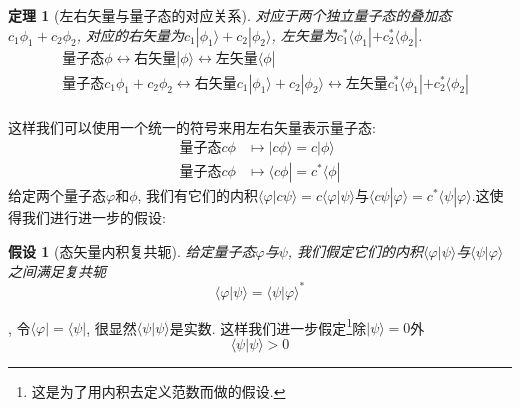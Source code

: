 \documentclass[a4paper,11pt]{article}
\theoremstyle{mystyle}
\newtheorem{theorem}{\hspace{2em}定理}[section]
\newtheorem{hypothesis}{\hspace{2em}假设}[section]
\begin{document}
\begin{theorem}[左右矢量与量子态的对应关系]
  对应于两个独立量子态的叠加态$c_1\phi_1+c_2\phi_2$, 对应的右矢量为$c_1|\phi_1\rangle+c_2|\phi_2\rangle$, 左矢量为$c_1^*\langle\phi_1|+c_2^*\langle\phi_2|$.
\begin{equation*}
  \begin{split}
     &\text{量子态}\phi\longleftrightarrow\text{右矢量}|\phi\rangle\longleftrightarrow\text{左矢量}\langle\phi|\\
     &\text{量子态}c_1\phi_1+c_2\phi_2\longleftrightarrow\text{右矢量}c_1|\phi_1\rangle+c_2|\phi_2\rangle\longleftrightarrow\text{左矢量}c_1^*\langle\phi_1|+c_2^*\langle\phi_2|\\
  \end{split}
\end{equation*}
\end{theorem}
这样我们可以使用一个统一的符号来用左右矢量表示量子态:
\begin{equation*}
  \begin{split}
     \text{量子态}c\phi & \longmapsto|c\phi\rangle=c|\phi\rangle \\
     \text{量子态}c\phi & \longmapsto\langle c\phi|=c^*\langle\phi|
  \end{split}
\end{equation*}
给定两个量子态$\varphi$和$\phi$, 我们有它们的内积$\langle\varphi|c\psi\rangle=c\langle\varphi|\psi\rangle$与$\langle c\psi|\varphi\rangle=c^*\langle\psi|\varphi\rangle$.这使得我们进行进一步的假设:
\begin{hypothesis}[态矢量内积复共轭]
给定量子态$\varphi$与$\psi$, 我们假定它们的内积$\langle\varphi|\psi\rangle$与$\langle\psi|\varphi\rangle$之间满足复共轭
\begin{equation*}
  \langle\varphi|\psi\rangle=\langle\psi|\varphi\rangle^*
\end{equation*}
\end{hypothesis}
, 令$\langle\varphi|=\langle\psi|$, 很显然$\langle\psi|\psi\rangle$是实数. 这样我们进一步假定\footnote{这是为了用内积去定义范数而做的假设.}除$|\psi\rangle=0$外
\begin{equation}\label{braket proper}
  \langle\psi|\psi\rangle>0
\end{equation}
\end{document}
